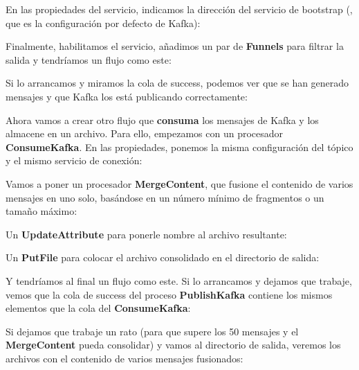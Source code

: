 \documentclass{../../miPlantilla}
\begin{document}

En las propiedades del servicio, indicamos la dirección del servicio de bootstrap (, que es la configuración por defecto de Kafka):


\newpage

Finalmente, habilitamos el servicio, añadimos un par de \textbf{Funnels} para filtrar la salida y tendríamos un flujo como este:


Si lo arrancamos y miramos la cola de success, podemos ver que se han generado mensajes y que Kafka los está publicando correctamente:


Ahora vamos a crear otro flujo que \textbf{consuma} los mensajes de Kafka y los almacene en un archivo. Para ello, empezamos con un procesador \textbf{ConsumeKafka}. En las propiedades, ponemos la misma configuración del tópico y el mismo servicio de conexión:


\newpage

Vamos a poner un procesador \textbf{MergeContent}, que fusione el contenido de varios mensajes en uno solo, basándose en un número mínimo de fragmentos o un tamaño máximo:


Un \textbf{UpdateAttribute} para ponerle nombre al archivo resultante:


Un \textbf{PutFile} para colocar el archivo consolidado en el directorio de salida:


\newpage

Y tendríamos al final un flujo como este. Si lo arrancamos y dejamos que trabaje, vemos que la cola de success del proceso \textbf{PublishKafka} contiene los mismos elementos que la cola del \textbf{ConsumeKafka}:


Si dejamos que trabaje un rato (para que supere los 50 mensajes y el \textbf{MergeContent} pueda consolidar) y vamos al directorio de salida, veremos los archivos con el contenido de varios mensajes fusionados:

\end{document}
